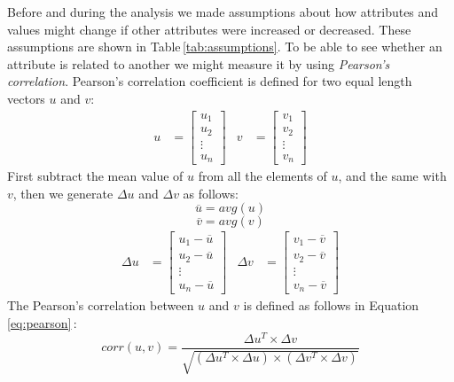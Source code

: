 \documentclass[USenglish]{uit-thesis}
\begin{document}
Before and during the analysis we made assumptions about how
attributes and values might change if other attributes were
increased or decreased. These assumptions are shown
in Table\,\ref{tab:assumptions}. To be able to see whether
an attribute is related to another we might
measure it by using \emph{Pearson's correlation}.
Pearson's correlation coefficient is defined for two equal
length vectors $u$ and $v$:
\begin{align}
u &= \begin{bmatrix}
u_{1} \\
u_{2} \\
\vdots \\
u_{n}
\end{bmatrix} &
v &= \begin{bmatrix}
v_{1}\\
v_{2}\\
\vdots\\
v_{n}
\end{bmatrix}
\end{align}
First subtract the mean value of $u$ from all the elements of $u$, and the same with $v$, then we generate $\Delta{u}$ and $\Delta{v}$ as follows:
\[
\overline{u} = avg(u)
\]
\[
\overline{v} = avg(v)
\]
\begin{align}
\Delta{u} &=\begin{bmatrix}
u_{1} - \overline{u}\\
u_{2} - \overline{u}\\
\vdots\\
u_{n} - \overline{u}
\end{bmatrix} &
\Delta{v} &=\begin{bmatrix}
v_{1} - \overline{v}\\
v_{2} - \overline{v}\\
\vdots\\
v_{n} - \overline{v}
\end{bmatrix} 
\end{align}
The Pearson's correlation between $u$ and $v$ is defined as follows
in Equation\,\ref{eq:pearson}\,\cite{bowles2015machine}:
\begin{equation}
\label{eq:pearson}
corr(u,v) = \frac{\Delta{u^{T}} \times \Delta{v}}{\sqrt{(\Delta{u^{T}}\times \Delta{u})\times (\Delta{v^{T}}\times \Delta{v})}}
\end{equation}
\end{document}
